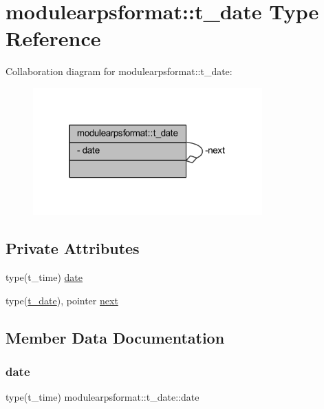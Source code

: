 \hypertarget{structmodulearpsformat_1_1t__date}{}\section{modulearpsformat\+:\+:t\+\_\+date Type Reference}
\label{structmodulearpsformat_1_1t__date}


Collaboration diagram for modulearpsformat\+:\+:t\+\_\+date\+:\nopagebreak
\begin{figure}[H]
\begin{center}
\leavevmode
\includegraphics[width=250pt]{structmodulearpsformat_1_1t__date__coll__graph}
\end{center}
\end{figure}
\subsection*{Private Attributes}
\begin{DoxyCompactItemize}
\item 
type(t\+\_\+time) \mbox{\hyperlink{structmodulearpsformat_1_1t__date_a5e835a66a4fdd2151c65dd1719061307}{date}}
\item 
type(\mbox{\hyperlink{structmodulearpsformat_1_1t__date}{t\+\_\+date}}), pointer \mbox{\hyperlink{structmodulearpsformat_1_1t__date_a417c5f6f3ee5646d7c42b45ccfef7af0}{next}}
\end{DoxyCompactItemize}


\subsection{Member Data Documentation}
\mbox{\label{structmodulearpsformat_1_1t__date_a5e835a66a4fdd2151c65dd1719061307}} 
\subsubsection{\texorpdfstring{date}{date}}
{\footnotesize\ttfamily type(t\+\_\+time) modulearpsformat\+::t\+\_\+date\+::date\hspace{0.3cm}{\ttfamily [private]}}

